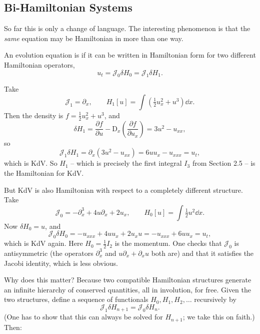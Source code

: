 \documentclass[a4paper]{scrartcl}
\newcommand{\D}{\mathrm{D}}
\begin{document}
\subsection{Bi-Hamiltonian Systems}

So far this is only a change of language. The interesting phenomenon is that the \emph{same} equation may be Hamiltonian in more than one way.

\begin{definition}[Bi-Hamiltonian]
	An evolution equation is  if it can be written in Hamiltonian form for two different Hamiltonian operators,
	$$
	u_t = \mathcal J_0\delta H_0 = \mathcal J_1\delta H_1.
	$$
\end{definition}

\begin{example}
	Take
	$$
	\mathcal J_1 = \partial_x, \qquad H_1[u] = \int\left(\tfrac{1}{2}u_x^2 + u^3\right)\dd x.
	$$
	Then the density is $f = \frac{1}{2}u_x^2 + u^3$, and
	$$
	\delta H_1 = \frac{\partial f}{\partial u} - \D_x\left(\frac{\partial f}{\partial u_x}\right) = 3u^2 - u_{xx},
	$$
	so
	$$
	\mathcal J_1\delta H_1 = \partial_x\left(3u^2 - u_{xx}\right) = 6uu_x - u_{xxx} = u_t,
	$$
	which is KdV. So $H_1$ -- which is precisely the first integral $I_3$ from Section 2.5 -- is the Hamiltonian for KdV.

	But KdV is also Hamiltonian with respect to a completely different structure. Take
	$$
	\mathcal J_0 = -\partial_x^3 + 4u\partial_x + 2u_x, \qquad H_0[u] = \int\tfrac{1}{2}u^2\dd x.
	$$
	Now $\delta H_0 = u$, and
	$$
	\mathcal J_0\delta H_0 = -u_{xxx} + 4uu_x + 2u_xu = -u_{xxx} + 6uu_x = u_t,
	$$
	which is KdV again. Here $H_0 = \frac{1}{2}I_2$ is the momentum. One checks that $\mathcal J_0$ is antisymmetric (the operators $\partial_x^3$ and $u\partial_x + \partial_xu$ both are) and that it satisfies the Jacobi identity, which is less obvious.
\end{example}

Why does this matter? Because two compatible Hamiltonian structures generate an infinite hierarchy of conserved quantities, all in involution, for free. Given the two structures, define a sequence of functionals $H_0, H_1, H_2,\dots$ recursively by
$$
\mathcal J_1\delta H_{n+1} = \mathcal J_0\delta H_n.
$$
(One has to show that this can always be solved for $H_{n+1}$; we take this on faith.) Then:
\end{document}
